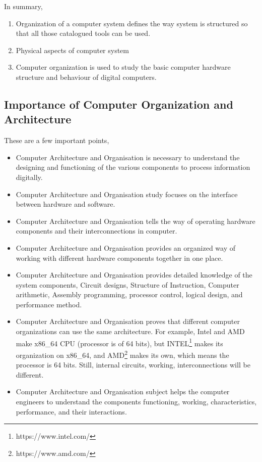 \documentclass[10pt,british]{report}
\begin{document}
\noindent In summary,
\begin{enumerate}
	\item Organization of a computer system defines the way system is structured
	      so that all those catalogued tools can be used.
	\item Physical aspects of computer system
	\item Computer organization is used to study the basic computer hardware
	      structure and behaviour of digital computers.
\end{enumerate}

\subsection{Importance of Computer Organization and Architecture}

These are a few important points,
\begin{itemize}
	\item Computer Architecture and Organisation is necessary to understand
	      the designing and functioning of the various components to process
	      information digitally.
	\item Computer Architecture and Organisation study focuses on the interface
	      between hardware and software.
	\item Computer Architecture and Organisation tells the way of operating
	      hardware components and their interconnections in computer.
	\item Computer Architecture and Organisation provides an organized way of
	      working with different hardware components together in one place.
	\item Computer Architecture and Organisation provides detailed knowledge
	      of the system components, Circuit designs, Structure of Instruction,
	      Computer arithmetic, Assembly programming, processor control, logical
	      design, and performance method.
	\item Computer Architecture and Organisation proves that different computer
	      organizations can use the same architecture. For example, Intel and
	      AMD make x86\_64 CPU (processor is of 64 bits), but INTEL\footnote{https://www.intel.com/}
	      makes its organization on x86\_64, and AMD\footnote{https://www.amd.com/}
	      makes its own, which means the processor is 64 bits. Still, internal
	      circuits, working, interconnections will be different.
	\item Computer Architecture and Organisation subject helps the computer
	      engineers to understand the components functioning, working, characteristics,
	      performance, and their interactions.
\end{itemize}
\end{document}
